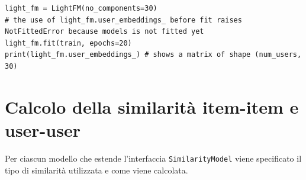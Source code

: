 \begin{itemize}
\begin{lstlisting}[caption=Esempio di utilizzo dei parametri appresi]
light_fm = LightFM(no_components=30)
# the use of light_fm.user_embeddings_ before fit raises NotFittedError because models is not fitted yet
light_fm.fit(train, epochs=20)
print(light_fm.user_embeddings_) # shows a matrix of shape (num_users, 30)
\end{lstlisting}

\end{itemize}

\section{Calcolo della similarità item-item e user-user}

Per ciascun modello che estende l'interfaccia \texttt{SimilarityModel} viene specificato il tipo di similarità utilizzata e come viene calcolata.

